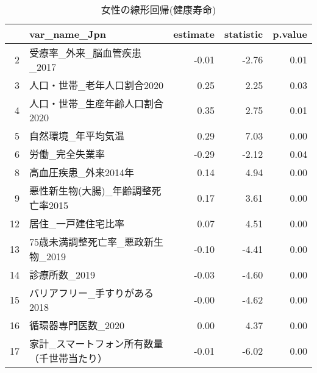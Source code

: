\begin{table}[H]
\centering
\caption{女性の線形回帰(健康寿命)} 
\label{UsualHLMLEf}
\begingroup\tiny
\begin{adjustbox}{width=1\textwidth}
\begin{tabular}{rlrrr}
  \hline
 & var\_name\_Jpn & estimate & statistic & p.value \\ 
  \hline
  2 & 受療率\_外来\_脳血管疾患\_2017 & -0.01 & -2.76 & 0.01 \\ 
  3 & 人口・世帯\_老年人口割合2020 & 0.25 & 2.25 & 0.03 \\ 
  4 & 人口・世帯\_生産年齢人口割合2020 & 0.35 & 2.75 & 0.01 \\ 
  5 & 自然環境\_年平均気温 & 0.29 & 7.03 & 0.00 \\ 
  6 & 労働\_完全失業率 & -0.29 & -2.12 & 0.04 \\ 
  8 & 高血圧疾患\_外来2014年 & 0.14 & 4.94 & 0.00 \\ 
  9 & 悪性新生物(大腸)\_年齢調整死亡率2015 & 0.17 & 3.61 & 0.00 \\ 
  12 & 居住\_一戸建住宅比率 & 0.07 & 4.51 & 0.00 \\ 
  13 & 75歳未満調整死亡率\_悪政新生物\_2019 & -0.10 & -4.41 & 0.00 \\ 
  14 & 診療所数\_2019 & -0.03 & -4.60 & 0.00 \\ 
  15 & バリアフリー\_手すりがある2018 & -0.00 & -4.62 & 0.00 \\ 
  16 & 循環器専門医数\_2020 & 0.00 & 4.37 & 0.00 \\ 
  17 & 家計\_スマートフォン所有数量（千世帯当たり） & -0.01 & -6.02 & 0.00 \\ 
   \hline
\end{tabular}
 \end{adjustbox}
\endgroup
\end{table}
